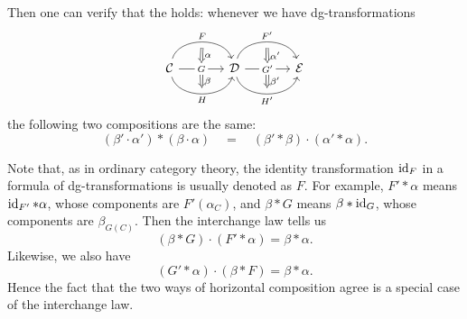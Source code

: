 {\begin{proplist}
\[\]
\item 
Then one can verify that the  holds:
whenever we have dg-transformations
\[
\begin{tikzcd}[column sep=large, row sep=large]
{\Cc}
\ar[r,bend left=75,"{F}",""{name=a,below}]
\ar[r,,"{G}"description,""{name=b},""{name={a'},below}]
\ar[r,bend right=75,"{H}"',""{name={b'}}]
\ar[Rightarrow,from=a,to=b,"{\alpha}"]
\ar[Rightarrow,from={a'},to={b'},"{\beta}"]&
{\Dd}
\ar[r,bend left=75,"{F'}",""{name=a,below}]
\ar[r,,"{G'}"description,""{name=b},""{name={a'},below}]
\ar[r,bend right=75,"{H'}"',""{name={b'}}]
\ar[Rightarrow,from=a,to=b,"{\alpha'}"]
\ar[Rightarrow,from={a'},to={b'},"{\beta'}"]&
{\Ee}
\end{tikzcd}
\]
the following two compositions are the same:
\[
(\beta'\cdot\alpha')\ast(\beta\cdot\alpha)
\quad=\quad
(\beta'\ast\beta)\cdot(\alpha'\ast\alpha).
\]
\item 
Note that, as in ordinary category theory, 
the identity transformation $\operatorname{id}_F$ in a formula of dg-transformations
is usually denoted as $F$. 
For example, $F'\ast\alpha$ means $\operatorname{id}_{F'}\ast\alpha$, 
whose components are $F'(\alpha_C)$, 
and $\beta\ast G$ means $\beta\ast\operatorname{id}_{G}$, 
whose components are $\beta_{G(C)}$.
Then the interchange law tells us 
\[
(\beta\ast G)\cdot(F'\ast\alpha) = \beta\ast\alpha.
\]
Likewise, we also have
\[
(G'\ast\alpha)\cdot(\beta\ast F) = \beta\ast\alpha.
\]
Hence the fact that the two ways of horizontal composition agree 
is a special case of the interchange law.
\end{proplist}
}

